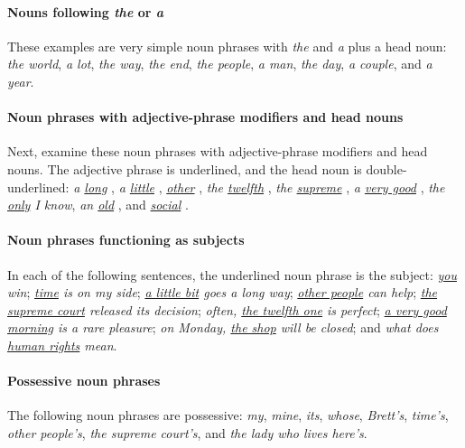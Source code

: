 \paragraph*{Nouns following \textit{the} or \textit{a}}
These examples are very simple noun phrases with \textit{the} and \textit{a} plus a head noun: \textit{the world}, \textit{a lot}, \textit{the way}, \textit{the end}, \textit{the people}, \textit{a man}, \textit{the day}, \textit{a couple}, and \textit{a year}.

\paragraph*{Noun phrases with adjective-phrase modifiers and head nouns}
Next, examine these noun phrases with adjective-phrase modifiers and head nouns. The adjective phrase is underlined, and the head noun is double-underlined: \textit{a \uline{long} }, \textit{a \uline{little} }, \textit{\uline{other} }, \textit{the \uline{twelfth} }, \textit{the \uline{supreme} }, \textit{a \uline{very good} }, \textit{the \uline{only}  I know}, \textit{an \uline{old} }, and \textit{\uline{social} }.

\paragraph*{Noun phrases functioning as subjects}
In each of the following sentences, the underlined noun phrase is the subject: \textit{\uline{you} win}; \textit{\uline{time} is on my side}; \textit{\uline{a little bit} goes a long way}; \textit{\uline{other people} can help}; \textit{\uline{the supreme court} released its decision}; \textit{often, \uline{the twelfth one} is perfect}; \textit{\uline{a very good morning} is a rare pleasure}; \textit{on Monday, \uline{the shop} will be closed}; and \textit{what does \uline{human rights} mean}.


\paragraph*{Possessive noun phrases}
The following noun phrases are possessive: \textit{my}, \textit{mine}, \textit{its}, \textit{whose}, \textit{Brett's}, \textit{time's}, \textit{other people's}, \textit{the supreme court's}, and \textit{the lady who lives here's}.

